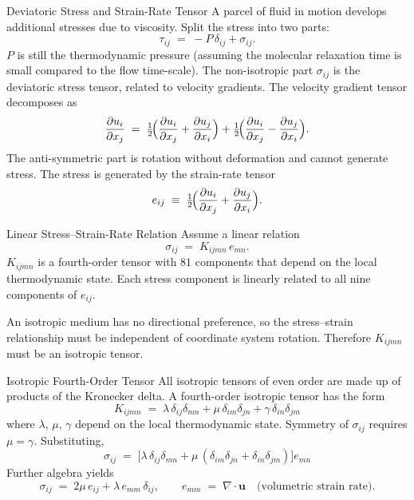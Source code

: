 \documentclass[10pt,aspectratio=43]{beamer}
\newcommand{\pd}[2]{\frac{\partial #1}{\partial #2}}
\newcommand{\bu}{\mathbf{u}}
\newcommand{\divg}{\nabla\!\cdot}
\begin{document}
\begin{frame}{Deviatoric Stress and Strain-Rate Tensor}
  A parcel of fluid in motion develops additional stresses due to viscosity.
  Split the stress into two parts:
  \[
    \tau_{ij} \;=\; -P\,\delta_{ij} + \sigma_{ij}.
  \]
  $P$ is still the thermodynamic pressure (assuming the molecular relaxation
  time is small compared to the flow time-scale). The non-isotropic part
  $\sigma_{ij}$ is the \alert{deviatoric stress tensor}, related to velocity
  gradients. The velocity gradient tensor decomposes as
  \[
    \pd{u_{i}}{x_{j}} \;=\;
      \tfrac{1}{2}\!\Bigl(\pd{u_{i}}{x_{j}}+\pd{u_{j}}{x_{i}}\Bigr)
      + \tfrac{1}{2}\!\Bigl(\pd{u_{i}}{x_{j}}-\pd{u_{j}}{x_{i}}\Bigr).
  \]
  The anti-symmetric part is rotation without deformation and cannot
  generate stress. The stress is generated by the \alert{strain-rate tensor}
  \[
    e_{ij} \;\equiv\; \tfrac{1}{2}\!\Bigl(\pd{u_{i}}{x_{j}}+\pd{u_{j}}{x_{i}}\Bigr).
  \]
\end{frame}

\begin{frame}{Linear Stress--Strain-Rate Relation}
  Assume a linear relation
  \[
    \sigma_{ij} \;=\; K_{ijmn}\,e_{mn}.
  \]
  $K_{ijmn}$ is a fourth-order tensor with $81$ components that depend on
  the local thermodynamic state. Each stress component is linearly related
  to all nine components of $e_{ij}$.

  \medskip
  An isotropic medium has no directional preference, so the stress--strain
  relationship must be independent of coordinate system rotation. Therefore
  $K_{ijmn}$ must be an \alert{isotropic tensor}.
\end{frame}

\begin{frame}{Isotropic Fourth-Order Tensor}
  All isotropic tensors of even order are made up of products of the
  Kronecker delta. A fourth-order isotropic tensor has the form
  \[
    K_{ijmn} \;=\; \lambda\,\delta_{ij}\delta_{mn}
                  + \mu\,\delta_{im}\delta_{jn}
                  + \gamma\,\delta_{in}\delta_{jm}
  \]
  where $\lambda$, $\mu$, $\gamma$ depend on the local thermodynamic state.
  Symmetry of $\sigma_{ij}$ requires $\mu = \gamma$. Substituting,
  \[
    \sigma_{ij} \;=\; \bigl[\lambda\,\delta_{ij}\delta_{mn} + \mu\,(\delta_{im}\delta_{jn}+\delta_{in}\delta_{jm})\bigr]e_{mn}
  \]
  Further algebra yields
  \[
    \sigma_{ij} \;=\; 2\mu\,e_{ij} + \lambda\,e_{mm}\,\delta_{ij},
    \qquad e_{mm} \;=\; \divg\bu \quad\text{(volumetric strain rate)}.
  \]
\end{frame}
\end{document}
